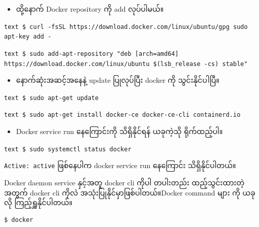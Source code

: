\documentclass{article}
\begin{document}
\begin{itemize}
\itemsep1pt\parskip0pt
\item
  ထို့နောက် Docker repository ကို add လုပ်ပါမယ်။
\end{itemize}

\texttt{text   \$ curl -fsSL https://download.docker.com/linux/ubuntu/gpg \textbar{} sudo apt-key add -}

\texttt{text   \$ sudo add-apt-repository "deb {[}arch=amd64{]} https://download.docker.com/linux/ubuntu \$(lsb\_release -cs) stable"}

\begin{itemize}
\itemsep1pt\parskip0pt
\item
  နောက်ဆုံးအဆင့်အနေနဲ့ update ပြုလုပ်ပြီး docker ကို သွင်းနိုင်ပါပြီ။
\end{itemize}

\texttt{text   \$ sudo apt-get update}

\texttt{text   \$ sudo apt-get install docker-ce docker-ce-cli containerd.io}

\begin{itemize}
\itemsep1pt\parskip0pt
\item
  Docker service run နေကြောင်းကို သိရှိနိုင်ရန် ယခုကဲ့သို ရိုက်ထည့်ပါ။
\end{itemize}

\texttt{text   \$ sudo systemctl status docker}

\texttt{Active: active} ဖြစ်နေပါက docker service run နေကြောင်း
သိရှိနိုင်ပါတယ်။

Docker daemon service နှင့်အတူ docker cli ကိုပါ တပါးတည်း ထည့်သွင်းထားတဲ့
အတွက် docker cli ကိုလဲ အသုံးပြုနိုင်မှာဖြစ်ပါတယ်။Docker command များ ကို
ယခုလို ကြည့်ရှူနိုင်ပါတယ်။

\begin{verbatim}
$ docker
\end{verbatim}
\end{document}
